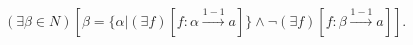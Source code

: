 $(\exists \beta \in N)[\beta = \{\alpha | (\exists f)[f: \alpha \xrightarrow{1-1} a]\} \land \neg (\exists f)[f: \beta \xrightarrow{1-1} a]]$.
